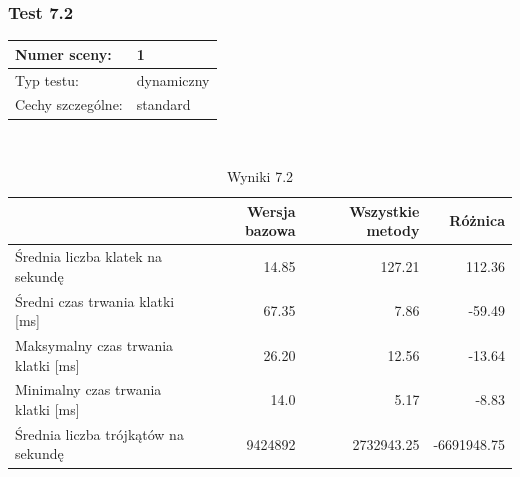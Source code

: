 \documentclass[a4paper,twoside,12pt]{book}
\begin{document}
\vbox{}

\subsubsection{Test 7.2}
\begin{tabular}{|l||l|}
\hline
Numer sceny: & 1 \\
\hline
Typ testu: & dynamiczny \\
\hline
Cechy szczególne: & standard \\
\hline
\end{tabular}\\

\vbox{}

\begin{table}[H]
    \centering
    \caption{Wyniki 7.2}
    \label{tab:all_test2}
    \begin{tabular}{|l||r|r|r|}
        \hline
        & Wersja bazowa & Wszystkie metody & Różnica \\
        \hline
        Średnia liczba klatek na sekundę & 14.85 & 127.21 & 112.36 \\
        \hline
        Średni czas trwania klatki [ms] & 67.35 & 7.86 & -59.49 \\
        \hline
        Maksymalny czas trwania klatki [ms] & 26.20 & 12.56 & -13.64 \\
        \hline
        Minimalny czas trwania klatki [ms] & 14.0 & 5.17 & -8.83 \\
        \hline
        Średnia liczba trójkątów na sekundę & 9424892 & 2732943.25 & -6691948.75 \\
        \hline
    \end{tabular}
\end{table}

\vbox{}
\end{document}
